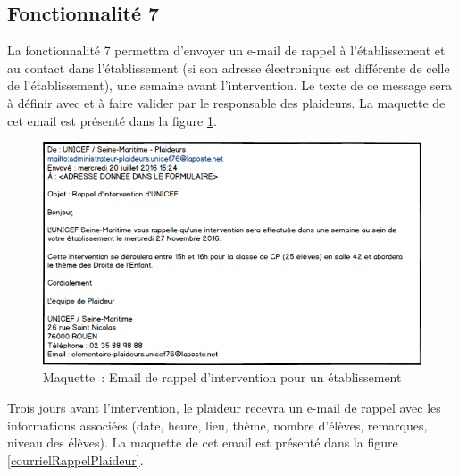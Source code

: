 \newpage
\subsection{Fonctionnalité 7}
La fonctionnalité 7 permettra d'envoyer un e-mail de rappel à l'établissement et au contact dans l'établissement (si son adresse électronique est différente de celle de l'établissement), une semaine avant l'intervention. Le texte de ce message sera à définir avec \nomClient{} et à faire valider par le responsable des plaideurs. La maquette de cet email est présenté dans la figure \ref{courrielRappelEtablissement}. \\

\begin{figure}[H]
	\centering
	\includegraphics[scale=0.675]{images/maquettes/fonctionnalite7MailDeRappelPourLEtablissement.png}
	\caption{Maquette~: Email de rappel d'intervention pour un établissement}
	\label{courrielRappelEtablissement}
\end{figure}

Trois jours avant l'intervention, le plaideur recevra un e-mail de rappel avec les informations associées (date, heure, lieu, thème, nombre d'élèves, remarques, niveau des élèves). 
La maquette de cet email est présenté dans la figure \ref{courrielRappelPlaideur}. \\
\\

